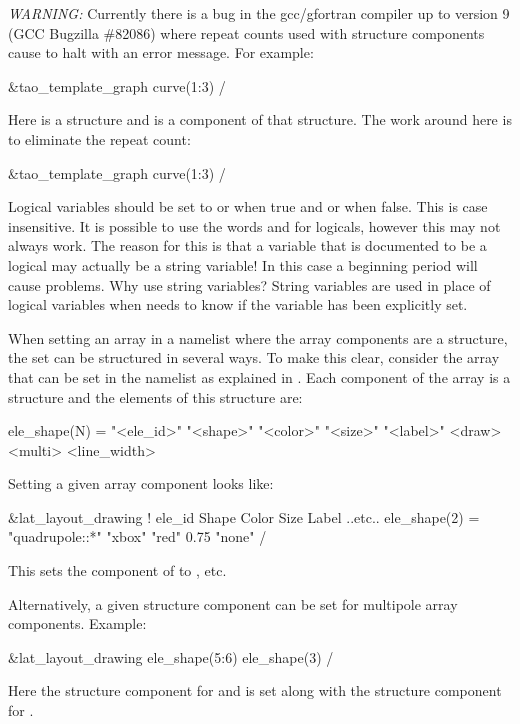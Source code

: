 {\em WARNING:} Currently there is a bug in the gcc/gfortran compiler up to version 9 (GCC Bugzilla
\#82086) where repeat counts used with structure components cause \tao to halt with an error
message. For example:
\begin{example}
  &tao_template_graph
    curve(1:3)%
  /
\end{example}
Here  is a structure and  is a component of that structure. The
work around here is to eliminate the repeat count:
\begin{example}
  &tao_template_graph
    curve(1:3)%
  /
\end{example}

Logical variables should be set to  or  when true and  or  when
false. This is case insensitive. It is possible to use the words  and  for
logicals, however this may not always work. The reason for this is that a variable that is
documented to be a logical may actually be a string variable! In this case a beginning period will
cause problems. Why use string variables? String variables are used in place of logical variables
when \tao needs to know if the variable has been explicitly set.

When setting an array in a namelist where the array components are a structure, the set can be
structured in several ways. To make this clear, consider the  array that can be set
in the  namelist as explained in . Each component
of the  array is a structure and the elements of this structure are:
\begin{example}
  ele_shape(N) = "<ele_id>" "<shape>" "<color>" "<size>" "<label>" <draw> <multi> <line_width>
\end{example}
Setting a given  array component looks like:
\begin{example}
  &lat_layout_drawing
    !               ele_id                  Shape      Color     Size  Label  ..etc..
    ele_shape(2) = "quadrupole::*"          "xbox"     "red"     0.75  "none" 
  /
\end{example}
This sets the  component of  to , etc.

Alternatively, a given structure component can be set for multipole array components. Example:
\begin{example}
  &lat_layout_drawing
    ele_shape(5:6)%
    ele_shape(3)%
  /
\end{example}
Here the  structure component for  and  is set along
with the  structure component for .

